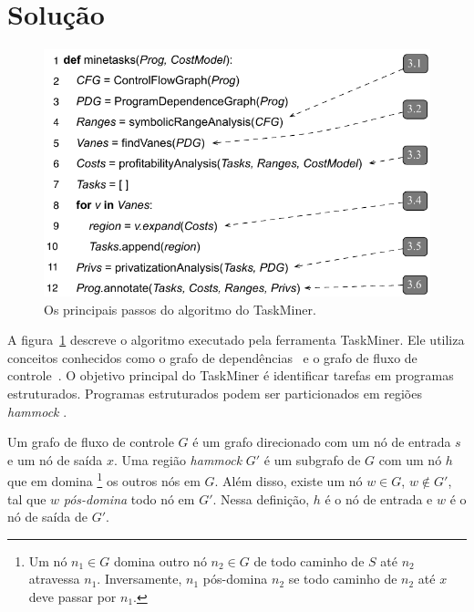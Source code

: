 \documentclass[sigplan,10pt,review]{acmart}
\newcommand\Taskminer{\mbox{\textsf{TaskMiner}}}
\begin{document}
\section{Solu\c{c}\~{a}o}
\label{sec:sol}

\begin{figure}[b]
\begin{center}
\includegraphics[width=1\columnwidth]{images/alg_main}
\caption{Os principais passos do algoritmo do TaskMiner.}
\label{fig:alg_main}
\end{center}
\end{figure}

A figura~\ref{fig:alg_main} descreve o algoritmo executado pela ferramenta {\Taskminer}. Ele utiliza conceitos conhecidos como
o grafo de dependências~\cite{Ferrante87} e o grafo de fluxo de controle~\cite{Kildall73}. O objetivo principal do {\Taskminer}
é identificar tarefas em programas estruturados. Programas estruturados podem ser particionados em regiões \textit{hammock}
\cite{Ferrante87}.

\begin{definition} 
\label{def:hammock}
Um grafo de fluxo de controle $G$ é um grafo direcionado com um nó de entrada
$s$ e um nó de saída $x$. Uma região \textit{hammock} $G'$ é um subgrafo de $G$ com um nó $h$ que {em domina}
\footnote{Um nó $n_1 \in G$ domina outro nó
$n_2 \in G$ de todo caminho de  $S$ até $n_2$ atravessa $n_1$.
Inversamente, $n_1$ pós-domina $n_2$ se todo caminho de $n_2$ até $x$ deve passar por $n_1$.} os outros nós em $G$.
Além disso, existe um nó $w \in G$, $w \notin G'$, tal que $w$ {\em pós-domina} todo nó em $G'$. Nessa definição,
$h$ é o nó de entrada e $w$ é o nó de saída de $G'$.  
\end{definition}
\end{document}
